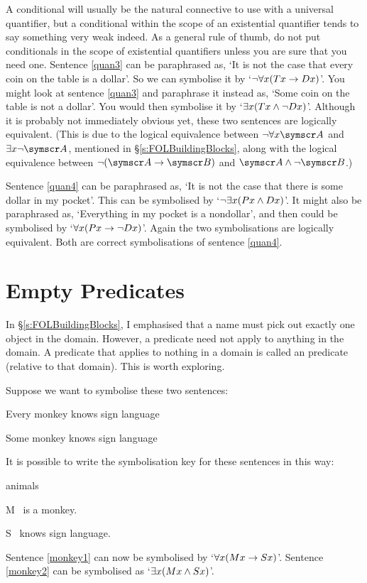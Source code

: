 A conditional will usually be the natural connective to use with a universal quantifier, but a conditional within the scope of an existential quantifier tends to say something very weak indeed. As a general rule of thumb, do not put conditionals in the scope of existential quantifiers unless you are sure that you need one.
Sentence \ref{quan3} can be paraphrased as, `It is not the case that every coin on the table is a dollar'. So we can symbolise it by `$\neg \forall x(Tx \rightarrow Dx)$'. You might look at sentence \ref{quan3} and paraphrase it instead as, `Some coin on the table is not a dollar'. You would then symbolise it by `$\exists x(Tx \wedge \neg Dx)$'. Although it is probably not immediately obvious yet, these two sentences are logically equivalent. (This is due to the logical equivalence between $\enot\forall x\meta{A}$ and $\exists x\enot\meta{A}$, mentioned in §\ref{s:FOLBuildingBlocks}, along with the logical equivalence between $\enot(\meta{A}\eif\meta{B})$ and $\meta{A}\eand\enot\meta{B}$.)

Sentence \ref{quan4} can be paraphrased as, `It is not the case that there is some dollar in my pocket'. This can be symbolised by `$\neg\exists x(Px \wedge Dx)$'. It might also be paraphrased as, `Everything in my pocket is a nondollar', and then could be symbolised by `$\forall x(Px \rightarrow \neg Dx)$'. Again the two symbolisations are logically equivalent. Both are correct symbolisations of sentence \ref{quan4}.


\section{Empty Predicates}
In §\ref{s:FOLBuildingBlocks}, I emphasised that a name must pick out exactly one object in the domain. However, a predicate need not apply to anything in the domain. A predicate that applies to nothing in a domain is called an  predicate (relative to that domain). This is worth exploring.

Suppose we want to symbolise these two sentences:
	\begin{earg}
		\item[\ex{monkey1}] Every monkey knows sign language
		\item[\ex{monkey2}] Some monkey knows sign language
	\end{earg}
It is possible to write the symbolisation key for these sentences in this way:
	\begin{ekey}
		\item[\text{domain}] animals
		\item[M] \blank\ is a monkey.
		\item[S] \blank\ knows sign language.
	\end{ekey}
Sentence \ref{monkey1} can now be symbolised by `$\forall x(Mx \rightarrow Sx)$'. Sentence \ref{monkey2} can be symbolised as `$\exists x(Mx \wedge Sx)$'.

